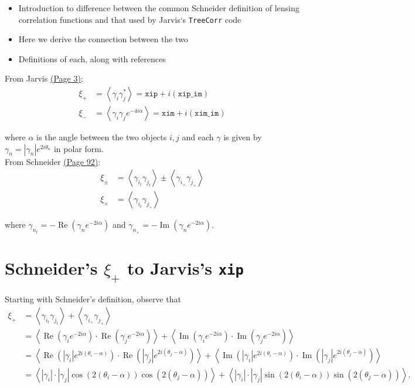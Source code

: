 \documentclass[%
 reprint,
 amsmath,amssymb,
 aps,
]{revtex4-1}
\begin{document}
\begin{itemize}
\item Introduction to difference between the common Schneider definition of lensing correlation functions and that used by Jarvis`s \texttt{TreeCorr} code
\item Here we derive the connection between the two
\item Definitions of each, along with references
\end{itemize}

From Jarvis \href{http://arxiv.org/pdf/astro-ph/0307393v2.pdf}{(Page 3)}:
\begin{align}
\xi_+&=\left<\gamma_i\gamma_j^*\right>=\texttt{xip}+i(\texttt{xip\_im})\label{s+}\\
\xi_-&=\left<\gamma_i\gamma_je^{-4i\alpha}\right>=\texttt{xim}+i(\texttt{xim\_im})\label{s-}
\end{align}

where $\alpha$ is the angle between the two objects $i,j$ and each $\gamma$ is given by $\gamma_n=|\gamma_n|e^{2i\theta_n}$ in polar form.\\

From Schneider \href{http://arxiv.org/pdf/astro-ph/0509252v1.pdf}{(Page 92)}:
\begin{align}
\xi_\pm&=\left<\gamma_{i_t}\gamma_{j_t}\right>\pm\left<\gamma_{i_\times}\gamma_{j_\times}\right>\label{s+-}\\
\xi_\times&=\left<\gamma_{i_t}\gamma_{j_\times}\right>\label{sx}
\end{align}

where $\gamma_{n_t}=-\operatorname{Re}\left(\gamma_n e^{-2i\alpha}\right)$ and $\gamma_{n_\times}=-\operatorname{Im}\left(\gamma_n e^{-2i\alpha}\right)$.\\

\section*{Schneider's $\xi_+$ to Jarvis's \texttt{xip}}

Starting with Schneider's definition, observe that
\begin{align*}
\xi_+&=\left<\gamma_{i_t}\gamma_{j_t}\right>+\left<\gamma_{i_\times}\gamma_{j_\times}\right>\\
&=\left<\operatorname{Re}\left(\gamma_ie^{-2i\alpha}\right)\cdot\operatorname{Re}\left(\gamma_je^{-2i\alpha}\right)\right>+\left<\operatorname{Im}\left(\gamma_ie^{-2i\alpha}\right)\cdot\operatorname{Im}\left(\gamma_je^{-2i\alpha}\right)\right>\\
&=\left<\operatorname{Re}\left(|\gamma_i|e^{2i(\theta_i-\alpha)}\right)\cdot\operatorname{Re}\left(|\gamma_j|e^{2i(\theta_j-\alpha)}\right)\right>+\left<\operatorname{Im}\left(|\gamma_i|e^{2i(\theta_i-\alpha)}\right)\cdot\operatorname{Im}\left(|\gamma_j|e^{2i(\theta_j-\alpha)}\right)\right>\\
&=\left<|\gamma_i|\cdot|\gamma_j|\cos\left(2(\theta_i-\alpha)\right)\cos\left(2(\theta_j-\alpha)\right)\right>+\left<|\gamma_i|\cdot|\gamma_j|\sin\left(2(\theta_i-\alpha)\right)\sin\left(2(\theta_j-\alpha)\right)\right>.
\end{align*}
\end{document}
